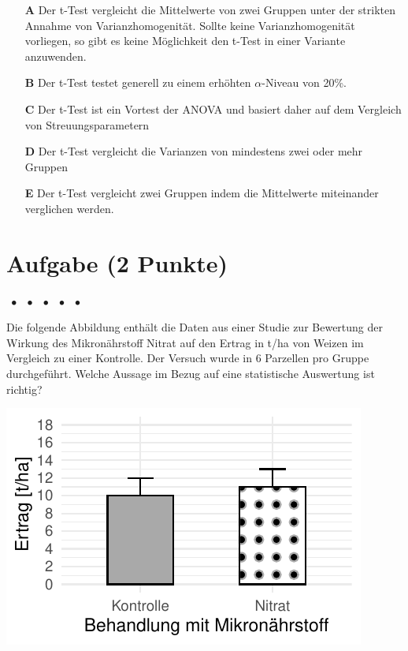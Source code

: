 \documentclass[a4paper, 9pt]{scrartcl}\usepackage[]{graphicx}\usepackage[]{xcolor}
\makeatletter
\def\maxwidth{ %
  \ifdim\Gin@nat@width>\linewidth
    \linewidth
  \else
    \Gin@nat@width
  \fi
}
\makeatother
\begin{document}
\begin{enumerate}
\item [\textbf{A} \msquare] Der t-Test vergleicht die Mittelwerte von zwei Gruppen unter der strikten Annahme von Varianzhomogenität. Sollte keine Varianzhomogenität vorliegen, so gibt es keine Möglichkeit den t-Test in einer Variante anzuwenden.
\item [\textbf{B} \msquare] Der t-Test testet generell zu einem erhöhten $\alpha$-Niveau von 20\%.
\item [\textbf{C} \msquare] Der t-Test ist ein Vortest der ANOVA und basiert daher auf dem Vergleich von Streuungsparametern
\item [\textbf{D} \msquare] Der t-Test vergleicht die Varianzen von mindestens zwei oder mehr Gruppen
\item [\textbf{E} \msquare] Der t-Test vergleicht zwei Gruppen indem die Mittelwerte miteinander verglichen werden.
\end{enumerate}

\section{Aufgabe \hfill (2 Punkte)}

\ifcollection
\begin{flushright}
\tiny\vspace{-2Ex}
\textbf{\examinhaltstart}
\exammodulemathstat $\;\bullet$
\exammodulestat $\;\bullet$
\exammodulestat $\;\bullet$
\exammodulestatbbv $\;\bullet$
\exammodulestatversuch $\;\bullet$
\exammodulebiostat
\vspace{-1Ex}
\end{flushright}
\fi




Die folgende Abbildung enthält die Daten aus einer Studie zur Bewertung der Wirkung des Mikronährstoff Nitrat auf den Ertrag in t/ha von Weizen im Vergleich zu einer Kontrolle. Der Versuch wurde in 6 Parzellen pro Gruppe durchgeführt. Welche Aussage im Bezug auf eine statistische Auswertung ist richtig?



{\centering \includegraphics[width=\maxwidth]{img/mc-testing-ttest-02-1} 

}
\end{document}
